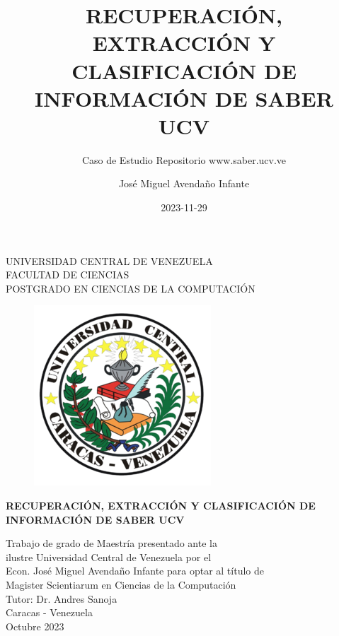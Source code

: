 \documentclass[
  12pt,
  openany]{book}
\title{RECUPERACIÓN, EXTRACCIÓN Y CLASIFICACIÓN DE INFORMACIÓN DE SABER UCV}
\subtitle{Caso de Estudio Repositorio www.saber.ucv.ve}
\author{José Miguel Avendaño Infante}
\date{2023-11-29}
\begin{document}
\maketitle

\thispagestyle{empty}
\begin{center}
	UNIVERSIDAD CENTRAL DE VENEZUELA\\
	FACULTAD DE CIENCIAS\\
	POSTGRADO EN CIENCIAS DE LA COMPUTACI\'ON\\

	\begin{figure}
						\centering
						  \includegraphics[height=.7\textwidth]{images/UCV.png}
  \end{figure}
  \vspace{1.5cm}
  \large{\textbf{RECUPERACI\'ON, EXTRACCI\'ON Y CLASIFICACI\'ON DE \\ INFORMACI\'ON DE SABER UCV}}

  \vspace{3cm}
  Trabajo de grado de Maestría presentado ante la \\
  ilustre Universidad Central de Venezuela por el\\
  Econ. José Miguel Avendaño Infante para  optar
  al título de \\Magister Scientiarum en Ciencias de la Computaci\'on\\
  \vspace{0.5cm}
  Tutor: Dr. Andres Sanoja\\
  \vspace{1.5cm}
  Caracas - Venezuela\\
  Octubre 2023
\end{center}
\end{document}
